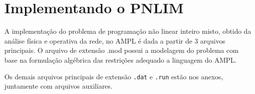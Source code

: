 \section{Implementando o PNLIM}

A implementação do problema de programação não linear inteiro misto, obtido da análise física e operativa da rede, no AMPL é dada a partir de 3 arquivos principais.
O arquivo de extensão .mod possui a modelagem do problema com base na formulação algébrica das restrições adequado a linguagem do AMPL. 



Os demais arquivos principais de extensão \verb|.dat| e \verb|.run| estão nos anexos, juntamente com arquivos auxiliares.


